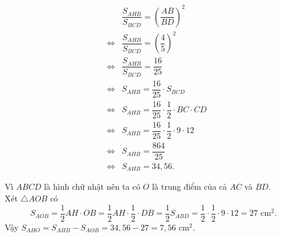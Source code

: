 \begin{ex}
{\begin{listEX}
\begin{eqnarray*}
			&&\dfrac{S_{AHB}}{S_{BCD}}=\left(\dfrac{AB}{BD}\right)^2\\
			&\Leftrightarrow& \dfrac{S_{AHB}}{S_{BCD}}=\left(\dfrac{4}{5}\right)^2\\
			&\Leftrightarrow&\dfrac{S_{AHB}}{S_{BCD}}=\dfrac{16}{25}\\
			&\Leftrightarrow&S_{AHB}=\dfrac{16}{25}\cdot S_{BCD}\\
			&\Leftrightarrow&S_{AHB}=\dfrac{16}{25}\cdot \dfrac{1}{2}\cdot BC\cdot CD\\
			&\Leftrightarrow&S_{AHB}=\dfrac{16}{25}\cdot \dfrac{1}{2}\cdot 9\cdot 12\\
			&\Leftrightarrow&S_{AHB}=\dfrac{864}{25}\\
			&\Leftrightarrow&S_{AHB}=34{,}56.
		\end{eqnarray*}
		\item 
		Vì $ABCD$ là hình chữ nhật nên ta có $O$ là trung điểm của cả $AC$ và $BD$.\\
		Xét $\triangle AOB$ có
		$$S_{AOB}=\dfrac{1}{2}AH\cdot OB=\dfrac{1}{2}AH\cdot \dfrac{1}{2}\cdot DB=\dfrac{1}{2}S_{ABD}=\dfrac{1}{2}\cdot \dfrac{1}{2}\cdot9\cdot12=27\text{ cm$^2$}.$$
		Vậy $S_{AHO}=S_{AHB}-S_{AOB}=34,56-27=7,56$ cm$^2$.
	\end{listEX}
}
\end{ex}

